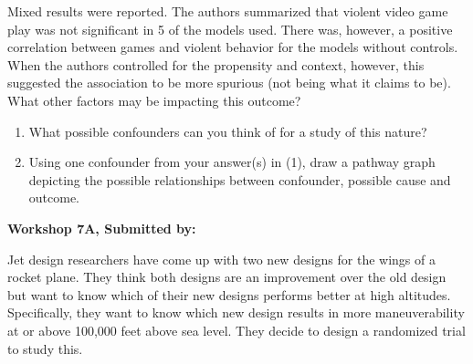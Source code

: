 \documentclass[11pt]{book}\usepackage[]{graphicx}\usepackage[]{color}
\begin{document}
\begin{exercises}
\begin{exercise}
Mixed results were reported.  The authors summarized that violent video game play was not significant in 5 of the models used.  There was, however, a positive correlation between games and violent behavior for the models without controls.   When the authors controlled for the propensity and context, however, this suggested the association to be more spurious (not being what it claims to be).  What other factors may be impacting this outcome?

\begin{enumerate}
  \item What possible confounders can you think of for a study of this nature?
  \item Using one confounder from your answer(s) in (1), draw a pathway graph depicting the possible relationships between confounder, possible cause and outcome.
\end{enumerate}
\end{exercise}
\begin{solution}  %

\end{solution}


\clearpage

    \begin{exercise}  %

    \begin{center}
\begin{flushleft}\textbf{\large \hfill Workshop 7A, Submitted by: }\end{flushleft}

\end{center}

Jet design researchers have come up with two new designs for the wings of a rocket plane. They think both designs are an improvement over the old design but want to know which of their new designs performs better at high altitudes. Specifically, they want to know which new design results in more maneuverability at or above 100,000 feet above sea level. They decide to design a randomized trial to study this.



\end{exercise}
\end{exercises}
\end{document}
